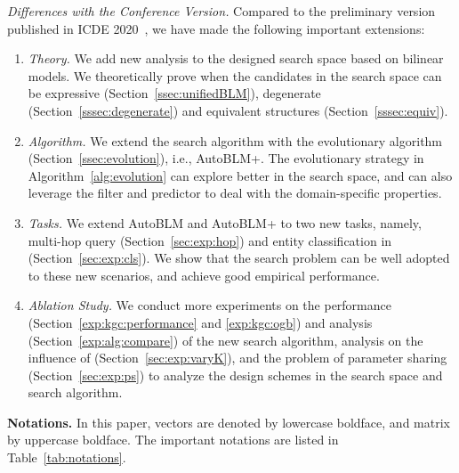 \documentclass[10pt,journal,compsoc]{IEEEtran}
\newcommand{\parabegin}[1]{\vspace{3px}\noindent\textbf{#1}}
\begin{document}
\vspace{3px}
\noindent
\textit{Differences with the Conference Version.}
Compared to 
the preliminary version published in ICDE 2020~\cite{zhang2020autosf},
we have made the following important extensions:
\begin{enumerate}[leftmargin=*]
\item \textit{Theory.}
We add new analysis to the designed 
search space based on bilinear models.
We theoretically prove
when the candidates in the search space can be expressive (Section~\ref{ssec:unifiedBLM}),
degenerate (Section~\ref{sssec:degenerate})
and equivalent structures (Section~\ref{sssec:equiv}).


\item 
\textit{Algorithm.}
We extend the search algorithm with the evolutionary algorithm (Section~\ref{ssec:evolution}),
i.e., AutoBLM+.
The evolutionary strategy in Algorithm~\ref{alg:evolution} 
can explore better in the search space,
and can also leverage the filter 
and predictor to deal with the domain-specific properties.

\item
\textit{Tasks.}
We extend AutoBLM and AutoBLM+ to two new tasks,
namely, multi-hop query (Section~\ref{sec:exp:hop})
and entity classification in (Section~\ref{sec:exp:cls}).
We show that the search problem can be well adopted to these new scenarios,
and achieve good empirical performance.

\item \textit{Ablation Study.}
We conduct more experiments on the performance 
(Section~\ref{exp:kgc:performance} and \ref{exp:kgc:ogb}) and analysis (Section~\ref{exp:alg:compare})
of the new search algorithm,
analysis on the influence of   
(Section~\ref{sec:exp:varyK}),
and the problem of parameter sharing (Section~\ref{sec:exp:ps})
to analyze the design schemes in the search space and search algorithm.



\end{enumerate}






\parabegin{Notations.}
In this paper, vectors are denoted by lowercase boldface, and matrix by uppercase boldface.
The important notations are listed in Table~\ref{tab:notations}.
\end{document}
